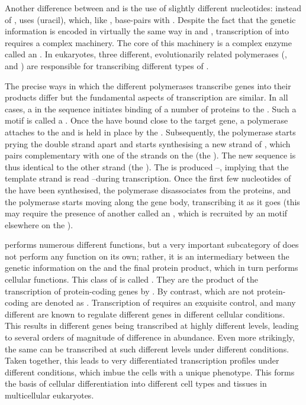 Another difference between \dna and \rna is the use of slightly different
nucleotides: instead of \nT, \rna uses \nU (uracil), which, like \nT, base-pairs
with \nA. Despite the fact that the genetic information is encoded in virtually
the same way in \dna and \rna, transcription of \dna into \rna requires a
complex machinery. The core of this machinery is a complex enzyme called an
. In eukaryotes, three different, evolutionarily related
\rna polymerases (,  and ) are responsible for transcribing
different types of \rna.

The precise ways in which the different polymerases transcribe genes into their
\rna products differ but the fundamental aspects of transcription are similar.
In all cases, a  in the
\dna sequence initiates binding of a number of \tf proteins to the \dna. Such a
motif is called a . Once the \tf[s] have bound close to the
target gene, a polymerase attaches to the \dna and is held in place by the
\tf[s]. Subsequently, the polymerase starts prying the double strand apart and
starts synthesising a new strand of \rna, which pairs complementary with one of
the strands on the \dna (the ). The new \rna[’s]
sequence is thus identical to the other \dna strand (the ). The \rna is produced \fivep--\threep, implying that the template
strand is read \threep--\fivep during transcription. Once the first few
nucleotides of the \rna have been synthesised, the polymerase disassociates from
the \tf proteins, and the polymerase starts moving along the gene body,
transcribing it as it goes (this may require the presence of another \tf called
an , which is recruited by an  motif
elsewhere on the \dna).

\rna performs numerous different functions, but a very important subcategory of
\rna does not perform any function on its own; rather, it is an intermediary
between the genetic information on the \dna and the final protein product, which
in turn performs cellular functions. This class of \rna is called \mrna. They
are the product of the transcription of protein-coding genes by . By
contrast, \rna[s] which are not protein-coding are denoted as \ncrna.
Transcription of \mrna requires an exquisite control, and many different \tf[s]
are known to regulate different genes in different cellular conditions. This
results in different \mrna genes being transcribed at highly different levels,
leading to several orders of magnitude of difference in \mrna abundance. Even
more strikingly, the same \mrna can be transcribed at such different levels
under different conditions. Taken together, this leads to very differentiated
\mrna transcription profiles under different conditions, which imbue the cells
with a unique phenotype. This forms the basis of cellular differentiation into
different cell types and tissues in multicellular eukaryotes.

